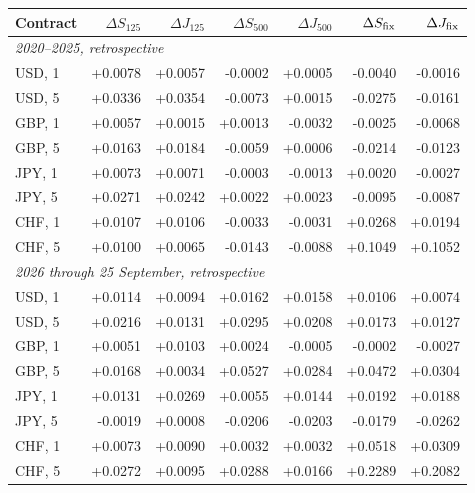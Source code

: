 \begin{tabular}{lrrrrrr}
\toprule
Contract & $\Delta S_{125}$ & $\Delta J_{125}$ & $\Delta S_{500}$ & $\Delta J_{500}$ & $\Delta S_{\rm fix}$ & $\Delta J_{\rm fix}$ \\
\midrule
\multicolumn{7}{l}{\textit{2020--2025, retrospective}} \\
USD, 1 & +0.0078 & +0.0057 & -0.0002 & +0.0005 & -0.0040 & -0.0016 \\
USD, 5 & +0.0336 & +0.0354 & -0.0073 & +0.0015 & -0.0275 & -0.0161 \\
GBP, 1 & +0.0057 & +0.0015 & +0.0013 & -0.0032 & -0.0025 & -0.0068 \\
GBP, 5 & +0.0163 & +0.0184 & -0.0059 & +0.0006 & -0.0214 & -0.0123 \\
JPY, 1 & +0.0073 & +0.0071 & -0.0003 & -0.0013 & +0.0020 & -0.0027 \\
JPY, 5 & +0.0271 & +0.0242 & +0.0022 & +0.0023 & -0.0095 & -0.0087 \\
CHF, 1 & +0.0107 & +0.0106 & -0.0033 & -0.0031 & +0.0268 & +0.0194 \\
CHF, 5 & +0.0100 & +0.0065 & -0.0143 & -0.0088 & +0.1049 & +0.1052 \\
\midrule
\multicolumn{7}{l}{\textit{2026 through 25 September, retrospective}} \\
USD, 1 & +0.0114 & +0.0094 & +0.0162 & +0.0158 & +0.0106 & +0.0074 \\
USD, 5 & +0.0216 & +0.0131 & +0.0295 & +0.0208 & +0.0173 & +0.0127 \\
GBP, 1 & +0.0051 & +0.0103 & +0.0024 & -0.0005 & -0.0002 & -0.0027 \\
GBP, 5 & +0.0168 & +0.0034 & +0.0527 & +0.0284 & +0.0472 & +0.0304 \\
JPY, 1 & +0.0131 & +0.0269 & +0.0055 & +0.0144 & +0.0192 & +0.0188 \\
JPY, 5 & -0.0019 & +0.0008 & -0.0206 & -0.0203 & -0.0179 & -0.0262 \\
CHF, 1 & +0.0073 & +0.0090 & +0.0032 & +0.0032 & +0.0518 & +0.0309 \\
CHF, 5 & +0.0272 & +0.0095 & +0.0288 & +0.0166 & +0.2289 & +0.2082 \\
\bottomrule
\end{tabular}
